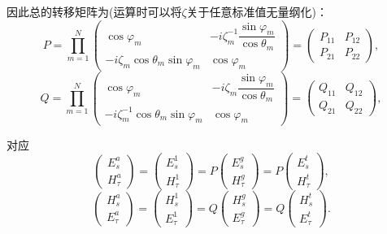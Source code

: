因此总的转移矩阵为(运算时可以将\(\zeta\)关于任意标准值无量纲化)：
\begin{equation*}
	P = \prod_{m=1}^{N}
	\begin{pmatrix}
		\cos\varphi_m                      & -i\zeta_m^{-1}\dfrac{\sin\varphi_m}{\cos\theta_m} \\
		-i\zeta_m\cos\theta_m\sin\varphi_m & \cos\varphi_m
	\end{pmatrix}
	=
	\begin{pmatrix}
		P_{11} & P_{12} \\
		P_{21} & P_{22}
	\end{pmatrix},
\end{equation*}
\begin{equation*}
	Q = \prod_{m=1}^{N}
	\begin{pmatrix}
		\cos\varphi_m                           & -i\zeta_m\dfrac{\sin\varphi_m}{\cos\theta_m} \\
		-i\zeta_m^{-1}\cos\theta_m\sin\varphi_m & \cos\varphi_m
	\end{pmatrix}
	=
	\begin{pmatrix}
		Q_{11} & Q_{12} \\
		Q_{21} & Q_{22}
	\end{pmatrix},
\end{equation*}

对应
\begin{equation*}
	\begin{pmatrix}
		E_s^a \\
		H_\tau^a
	\end{pmatrix}
	=
	\begin{pmatrix}
		E_s^1 \\
		H_\tau^1
	\end{pmatrix}
	= P
	\begin{pmatrix}
		E_s^g \\
		H_\tau^g
	\end{pmatrix}
	= P
	\begin{pmatrix}
		E_s^t \\
		H_\tau^t
	\end{pmatrix},
\end{equation*}
\begin{equation*}
	\begin{pmatrix}
		H_s^a \\
		E_\tau^a
	\end{pmatrix}
	=
	\begin{pmatrix}
		H_s^1 \\
		E_\tau^1
	\end{pmatrix}
	= Q
	\begin{pmatrix}
		H_s^g \\
		E_\tau^g
	\end{pmatrix}
	= Q
	\begin{pmatrix}
		H_s^t \\
		E_\tau^t
	\end{pmatrix}.
\end{equation*}

